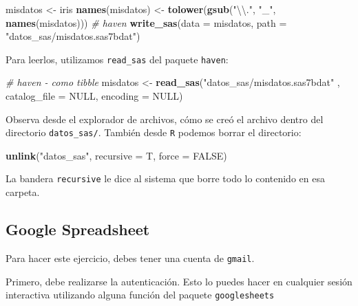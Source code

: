 \documentclass[]{article}
\newenvironment{Shaded}{\begin{snugshade}}{\end{snugshade}}
\newcommand{\KeywordTok}[1]{\textcolor[rgb]{0.13,0.29,0.53}{\textbf{#1}}}
\newcommand{\DataTypeTok}[1]{\textcolor[rgb]{0.13,0.29,0.53}{#1}}
\newcommand{\CharTok}[1]{\textcolor[rgb]{0.31,0.60,0.02}{#1}}
\newcommand{\StringTok}[1]{\textcolor[rgb]{0.31,0.60,0.02}{#1}}
\newcommand{\CommentTok}[1]{\textcolor[rgb]{0.56,0.35,0.01}{\textit{#1}}}
\newcommand{\OtherTok}[1]{\textcolor[rgb]{0.56,0.35,0.01}{#1}}
\newcommand{\NormalTok}[1]{#1}
\begin{document}
\begin{Shaded}
\begin{Highlighting}[]
\NormalTok{misdatos <-}\StringTok{ }\NormalTok{iris}
\KeywordTok{names}\NormalTok{(misdatos) <-}\StringTok{ }\KeywordTok{tolower}\NormalTok{(}\KeywordTok{gsub}\NormalTok{(}\StringTok{"}\CharTok{\textbackslash{}\textbackslash{}}\StringTok{."}\NormalTok{, }\StringTok{"_"}\NormalTok{, }\KeywordTok{names}\NormalTok{(misdatos)))}
\CommentTok{# haven}
\KeywordTok{write_sas}\NormalTok{(}\DataTypeTok{data =}\NormalTok{ misdatos, }\DataTypeTok{path =} \StringTok{"datos_sas/misdatos.sas7bdat"}\NormalTok{)}
\end{Highlighting}
\end{Shaded}

Para leerlos, utilizamos \texttt{read\_sas} del paquete \texttt{haven}:

\begin{Shaded}
\begin{Highlighting}[]
\CommentTok{# haven - como tibble}
\NormalTok{misdatos <-}\StringTok{ }\KeywordTok{read_sas}\NormalTok{(}\StringTok{"datos_sas/misdatos.sas7bdat"}
\NormalTok{                     , }\DataTypeTok{catalog_file =} \OtherTok{NULL}\NormalTok{, }\DataTypeTok{encoding =} \OtherTok{NULL}\NormalTok{)}
\end{Highlighting}
\end{Shaded}

Observa desde el explorador de archivos, cómo se creó el archivo dentro
del directorio \texttt{datos\_sas/}. También desde \texttt{R} podemos
borrar el directorio:

\begin{Shaded}
\begin{Highlighting}[]
\KeywordTok{unlink}\NormalTok{(}\StringTok{"datos_sas"}\NormalTok{, }\DataTypeTok{recursive =}\NormalTok{ T, }\DataTypeTok{force =} \OtherTok{FALSE}\NormalTok{)}
\end{Highlighting}
\end{Shaded}

La bandera \texttt{recursive} le dice al sistema que borre todo lo
contenido en esa carpeta.

\subsection{Google Spreadsheet}\label{google-spreadsheet}

Para hacer este ejercicio, debes tener una cuenta de \texttt{gmail}.

Primero, debe realizarse la autenticación. Esto lo puedes hacer en
cualquier sesión interactiva utilizando alguna función del paquete
\texttt{googlesheets}
\end{document}
